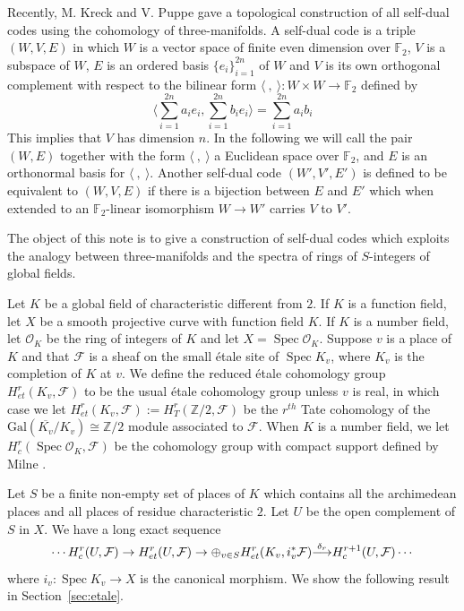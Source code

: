 \documentclass[noams]{compositio}
\theoremstyle{definition} %
\theoremstyle{remark} %
\DeclareMathOperator{\Spec}{\mathrm{Spec}}
\newcommand{\cF}{\mathcal{F}}
\newcommand{\cO}{\mathcal{O}}
\newcommand{\F}{\mathbb{F}}
\newcommand{\Z}{\mathbb{Z}}
\def\arrow#1#2{\smash{\mathop{\longrightarrow}\limits^{#1}_{#2}}} %
\begin{document}
Recently, M. Kreck and V. Puppe \cite{Kreck2008} gave a topological construction of all self-dual codes using  the cohomology of three-manifolds. A self-dual code is a triple $(W,V,E)$ in which $W$ is a vector space of finite even dimension over $\F_2$, $V$ is a subspace of $W$, $E $ is an ordered basis $\{e_i\}_{i = 1}^{2n}$ of $W$ and $V$ is its own orthogonal complement with respect to the
bilinear form $\langle \ , \ \rangle:W\times W \to \F_2$ defined by 
\[\langle \sum_{i=1}^{2n} a_i e_i, \sum_{i= 1}^{2n}b_i e_i \rangle =\sum_{i=1}^{2n} a_i b_i
\]
This implies that $V$ has dimension $n$.  In the following we will call the pair $(W,E)$ together with the form $\langle \  , \ \rangle$ a Euclidean space over $\F_2$, and $E$ is an orthonormal basis for $\langle \ , \ \rangle$.  Another self-dual code $(W',V',E')$ is defined
to be equivalent
to $(W,V,E)$ if there is a bijection between $E$ and $E'$ which when extended to an $\F_2$-linear isomorphism $W \to W'$
carries $V$ to $V'$.


The object of this note is to give a construction of self-dual codes which exploits the analogy between three-manifolds and the spectra of rings of $S$-integers of global fields.

Let $K$ be a global field of characteristic different from $2$. If $K$ is a function field, let $X$ be a smooth projective curve  with function field $K$. If $K$ is a number field, let $\cO_K$ be the ring of integers of $K$ and let $X= \Spec \cO_K$.  Suppose $v$ is a place of $K$ and that $\cF $ is a sheaf on the small \'etale site of $\Spec K_v$, where $K_v$ is the completion of $K$ at $v$. We define the reduced \'etale cohomology group $H^r_{et}(K_v,\cF)$ to be the usual \'etale cohomology group unless $v$ is real, in which case we let $H^r_{et}(K_v, \cF):=H^r_T(\Z/2, \cF)$ be the $r^{th}$ Tate cohomology of the $\mathrm{Gal}(\overline{K_v}/K_v) \cong \Z/2$ module associated to $\cF$. When $K$ is a number field, we let
$H^r_c(\Spec \cO_K,\cF)$ be the cohomology group with compact support defined by Milne   \cite[section 2, p165]{Milne2006}.

Let $S$ be a finite non-empty set of places of $K$ which contains all the archimedean places and all places of residue characteristic $2$. Let $U$ be the open complement of $S$ in $X$. We have a long exact sequence
\begin{equation}
\label{eq:longexact}
\cdots H^r_c(U, \cF)\to H^r_{et}(U, \cF)\to \oplus_{v\in S}H^r_{et}(K_v, i_v^*\cF)\arrow{\delta_r}{} H^{r+1}_c(U, \cF) \cdots
\end{equation}
where $i_v\colon\Spec K_v \to X$ is the canonical morphism.
We show the following result in
Section~\ref{sec:etale}.
\end{document}
